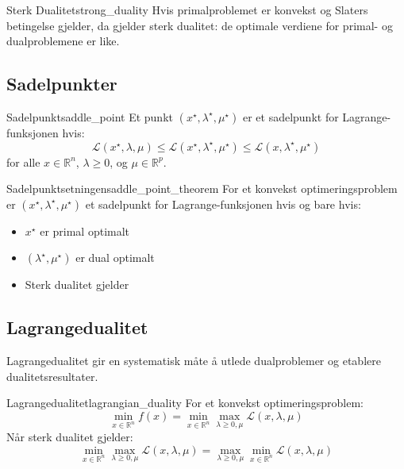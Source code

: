 \begin{theorem}{Sterk Dualitet}{strong_duality}
	Hvis primalproblemet er konvekst og Slaters betingelse gjelder, da gjelder sterk dualitet: de optimale verdiene for primal- og dualproblemene er like.
\end{theorem}

\subsection{Sadelpunkter}

\begin{definition}{Sadelpunkt}{saddle_point}
	Et punkt \( (x^\star, \lambda^\star, \mu^\star) \) er et sadelpunkt for Lagrange-funksjonen hvis:
	\[
		\mathcal{L}(x^\star, \lambda, \mu) \leq \mathcal{L}(x^\star, \lambda^\star, \mu^\star) \leq \mathcal{L}(x, \lambda^\star, \mu^\star)
	\]
	for alle \( x \in \mathbb{R}^n \), \( \lambda \geq 0 \), og \( \mu \in \mathbb{R}^p \).
\end{definition}

\begin{theorem}{Sadelpunktsetningen}{saddle_point_theorem}
	For et konvekst optimeringsproblem er \( (x^\star, \lambda^\star, \mu^\star) \) et sadelpunkt for Lagrange-funksjonen hvis og bare hvis:
	\begin{itemize}
		\item \( x^\star \) er primal optimalt
		\item \( (\lambda^\star, \mu^\star) \) er dual optimalt
		\item Sterk dualitet gjelder
	\end{itemize}
\end{theorem}

\subsection{Lagrangedualitet}

Lagrangedualitet gir en systematisk måte å utlede dualproblemer og etablere dualitetsresultater.

\begin{theorem}{Lagrangedualitet}{lagrangian_duality}
	For et konvekst optimeringsproblem:
	\[
		\min_{x \in \mathbb{R}^n} f(x) = \min_{x \in \mathbb{R}^n} \max_{\lambda \geq 0, \mu} \mathcal{L}(x, \lambda, \mu)
	\]
	Når sterk dualitet gjelder:
	\[
		\min_{x \in \mathbb{R}^n} \max_{\lambda \geq 0, \mu} \mathcal{L}(x, \lambda, \mu) = \max_{\lambda \geq 0, \mu} \min_{x \in \mathbb{R}^n} \mathcal{L}(x, \lambda, \mu)
	\]
\end{theorem}

